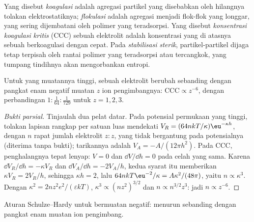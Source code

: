 \begin{definition}\label{def:b3:colloids:stability}
Yang disebut \emph{koagulasi} adalah agregasi partikel 
yang disebabkan oleh hilangnya tolakan elektrostatiknya; \emph{flokulasi}
adalah agregasi menjadi flok-flok yang longgar, yang sering dijembatani oleh
polimer yang teradsorpsi. Yang disebut
\emph{konsentrasi koagulasi kritis}
(CCC) sebuah elektrolit adalah konsentrasi yang di atasnya sebuah
 berkoagulasi dengan cepat. Pada \emph{stabilisasi sterik},
partikel-partikel dijaga tetap terpisah oleh rantai polimer yang
teradsorpsi atau tercangkok, yang tumpang tindihnya akan mengorbankan entropi.
\end{definition}

\begin{proposition}\label{prop:b3:colloids:schulze-hardy}
Untuk  yang muatannya tinggi,  sebuah
elektrolit berubah sebanding dengan pangkat enam negatif muatan $z$ ion
pengimbangnya: $\text{CCC} \propto z^{-6}$, dengan perbandingan $1 : \frac{1}{64} : \frac{1}{729}$ untuk $z = 1, 2, 3$.
\end{proposition}

\begin{proof}[Bukti parsial]
Tinjaulah dua pelat datar. Pada potensial permukaan yang tinggi, tolakan lapisan rangkap per
satuan luas mendekati $V_R = (64nkT/\kappa)\eu^{-\kappa h}$, dengan $n$ rapat jumlah elektrolit $z{:}z$,
yang tidak bergantung pada potensialnya (diterima tanpa bukti); tarikannya adalah $V_A =
-A/(12\pi h^2)$. Pada CCC, penghalangnya tepat lenyap: $V = 0$ dan $\dd V/\dd h = 0$ pada celah yang
sama. Karena $\dd V_R/\dd h = -\kappa V_R$ dan $\dd V_A/\dd h = -2V_A/h$, kedua syarat itu memberikan
$\kappa V_R = 2V_R/h$, sehingga $\kappa h = 2$, lalu $64nkT\eu^{-2}/\kappa = A\kappa^2/(48\pi)$, yaitu $n \propto \kappa^3$. Dengan
$\kappa^2 = 2nz^2e^2/(\varepsilon kT)$, $\kappa^3 \propto (nz^2)^{3/2}$ dan $n \propto n^{3/2}z^3$: jadi $n \propto z^{-6}$.
\end{proof}

\begin{omfigure}

{\small Aturan Schulze--Hardy untuk  bermuatan negatif:  menurun sebanding dengan pangkat enam muatan ion pengimbang.}
\end{omfigure}

